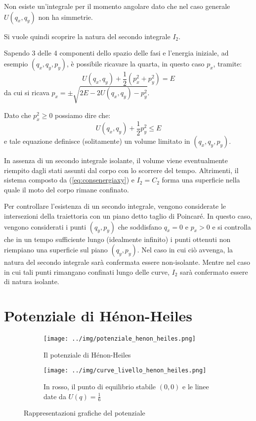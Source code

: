 \documentclass[a4paper, 12pt]{article}
\numberwithin{equation}{section}
\numberwithin{figure}{section}
\begin{document}
Non esiste un'integrale per il momento angolare dato che nel caso generale $U(q_x,q_y)$ non ha
simmetrie.

Si vuole quindi scoprire la natura del secondo integrale $I_2$.

Sapendo 3 delle 4 componenti dello spazio delle fasi e l'energia iniziale, ad esempio $(q_x,q_y,p_y)$,
è possibile ricavare la quarta, in questo caso $p_x$, tramite:
\begin{equation}
	U(q_x,q_y)+\frac{1}{2}(p_x^2+p_y^2) = E \label{eq:consenergiaxy}
\end{equation}
da cui si ricava $p_x = \pm \sqrt{2E-2U(q_x,q_y)-p_y^2}$.

Dato che $p_x^2 \ge 0$ possiamo dire che:
\begin{equation}
	U(q_x,q_y)+\frac{1}{2}p_y^2 \le E
\end{equation}
e tale equazione definisce (solitamente) un volume limitato in $(q_x,q_y,p_y)$.

In assenza di un secondo integrale isolante, il volume viene eventualmente riempito
dagli stati assunti dal corpo con lo scorrere del tempo.
Altrimenti, il sistema composto da (\ref{eq:consenergiaxy}) e $I_2 = C_2$ forma una
superficie nella quale il moto del corpo rimane confinato.

Per controllare l'esistenza di un secondo integrale, vengono considerate le intersezioni della
traiettoria con un piano detto taglio di Poincaré. In questo caso, vengono considerati i punti
$(q_y,p_y)$ che soddisfano $q_x=0$ e $p_x>0$ e si controlla che in un tempo sufficiente lungo
(idealmente infinito) i punti ottenuti non riempiano una superficie sul piano $(q_y,p_y)$. Nel
caso in cui ciò avvenga, la natura del secondo integrale sarà confermata essere non-isolante. Mentre
nel caso in cui tali punti rimangano confinati lungo delle curve, $I_2$ sarà confermato essere di natura
isolante.

\section{Potenziale di Hénon-Heiles}

\begin{figure}[h!]
	\centering
	\begin{subfigure}[t]{.5\textwidth}
		\centering
		\texttt{[image: ../img/potenziale\_henon\_heiles.png]}
		\caption{Il potenziale di Hénon-Heiles}
		\label{img:potenziale3d}
	\end{subfigure}%
	\begin{subfigure}[t]{.5\textwidth}
		\centering
		\texttt{[image: ../img/curve\_livello\_henon\_heiles.png]}
		\caption{In rosso, il punto di equilibrio stabile $(0,0)$ e le linee date da
		$U(q)=\frac{1}{6}$} 
		\label{img:curvelivello}
	\end{subfigure}
	\caption{Rappresentazioni grafiche del potenziale}
	\label{img:potenzialehh}
\end{figure}
\end{document}
